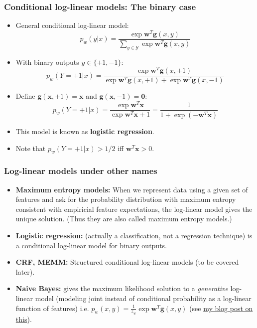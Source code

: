 \documentclass[ignorenonframetext,plain]{beamer}
\renewcommand{\vec}{\mathbf}
\begin{document}
\begin{frame}\frametitle{Conditional log-linear models: The binary case}
\begin{itemize}
\item General conditional log-linear model:\[
  p_w(y|x) = \frac{\exp \vec{w}^T \vec{g}(x, y)}
  {\sum_{y\in\mathcal{Y}} \exp \vec{w}^T \vec{g}(x, y)}
\]
\item With binary outputs $y\in\{+1,-1\}$:\[
  p_w(Y=+1|x) = \frac{\exp \vec{w}^T \vec{g}(x, +1)}
  {\exp \vec{w}^T \vec{g}(x, +1)+\exp \vec{w}^T \vec{g}(x, -1)}
\]
\item Define $\vec{g}(\vec{x}, +1) = \vec{x}$ and $\vec{g}(\vec{x}, -1) = \vec{0}$:\[
  p_w(Y=+1|x) =
  \frac{\exp \vec{w}^T \vec{x}}
       {\exp \vec{w}^T \vec{x}+1} =
  \frac{1}{1+\exp(-\vec{w}^T \vec{x})}
\]
\item This model is known as {\bf logistic regression}.
\item Note that $p_w(Y=+1|x) > 1/2$ iff $\vec{w}^T\vec{x} > 0$.
\end{itemize}  
\end{frame}

\begin{frame}\frametitle{Log-linear models under other names}
\begin{itemize}
\item \textbf{Maximum entropy models:} When we represent data using a
  given set of features and ask for the probability distribution with
  maximum entropy consistent with empiricial feature expectations, the
  log-linear model gives the unique solution.  (Thus they are also
  called maximum entropy models.)
\item \textbf{Logistic regression:} (actually a classification, not a
  regression technique) is a conditional log-linear model for binary
  outputs.
\item \textbf{CRF, MEMM:} Structured conditional log-linear models (to
  be covered later).
\item \textbf{Naive Bayes:} gives the maximum likelihood solution to a
  {\em generative} log-linear model (modeling joint instead of
  conditional probability as a log-linear function of features)
  i.e. $p_w(x,y) = \frac{1}{z_w}\exp \vec{w}^T \vec{g}(x, y)$
  (see
  \href{http://www.denizyuret.com/2010/11/naive-bayes-is-joint-maximum-entropy.html}{my
    blog post on this}).
\end{itemize}
\end{frame}
\end{document}
